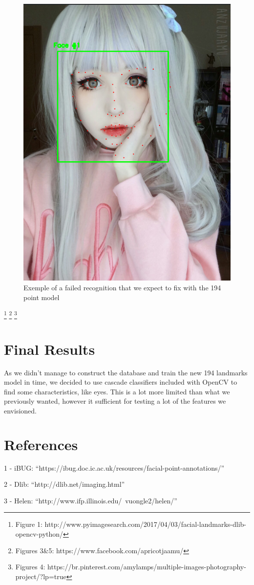 \documentclass[12pt,a4paper]{article}
\begin{document}
    \begin{figure}[!ht]
        \centering
        \includegraphics[scale=0.5]{AnzuscWrong.png}
        \caption{Exemple of a failed recognition that we expect to fix with the 194 point model}
        \label{Anzu2}
    \end{figure}
    
    \footnote{Figure 1: http://www.pyimagesearch.com/2017/04/03/facial-landmarks-dlib-opencv-python/}
    \footnote{Figures 3\&5: https://www.facebook.com/apricotjaamu/}
    \footnote{Figures 4: https://br.pinterest.com/amylamps/multiple-images-photography-project/?lp=true}
    
\newpage

\section{Final Results}
    As we didn't manage to construct the database and train the new 194 landmarks model in time, we decided to use cascade classifiers included with OpenCV to find some characteristics, like eyes. This is a lot more limited than what we previously wanted, however it sufficient for testing a lot of the features we envisioned.

\section{References}

1 - iBUG: ``https://ibug.doc.ic.ac.uk/resources/facial-point-annotations/''\\
\par2 - Dlib: ``http://dlib.net/imaging.html''\\
\par3 - Helen: ``http://www.ifp.illinois.edu/~vuongle2/helen/''
\end{document}
